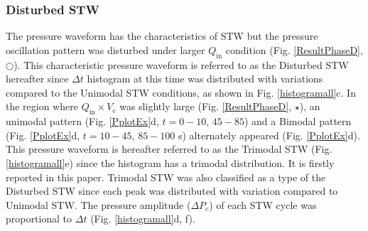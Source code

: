 \documentclass[aps,pre,preprint,groupedaddress,showkeys]{revtex4-2}
\begin{document}
\subsubsection{Disturbed STW}
The pressure waveform has the characteristics of STW but the pressure oscillation pattern was disturbed under larger $Q_\mathrm{in} $ condition (Fig. \ref {ResultPhaseD}, $\bigcirc$).
This characteristic pressure waveform is referred to as the Disturbed STW hereafter since $\Delta t$ histogram at this time was distributed with variations compared to the Unimodal STW conditions, as shown in Fig. \ref{histogramall}c.
In the region where $ Q_ \mathrm{in} \times V_\mathrm{c} $ was slightly large (Fig. \ref{ResultPhaseD}, $\star$), an unimodal pattern (Fig. \ref{PplotEx}d, $ t = 0 - 10 $, $ 45 - 85 $) and a Bimodal pattern (Fig. \ref{PplotEx}d, $ t = 10 -  45 $, $ 85 - 100 $ s) alternately appeared (Fig. \ref{PplotEx}d).
This pressure waveform is hereafter referred to as the Trimodal STW (Fig. \ref{histogramall}e) since the histogram has a trimodal distribution. It is firstly reported in this paper.
Trimodal STW was also classified as a type of the Disturbed STW since each peak was distributed with variation compared to Unimodal STW. 
The pressure amplitude ($ \Delta P_c $) of each STW cycle was proportional to $ \Delta t $ (Fig. \ref{histogramall}d, f).
\end{document}
